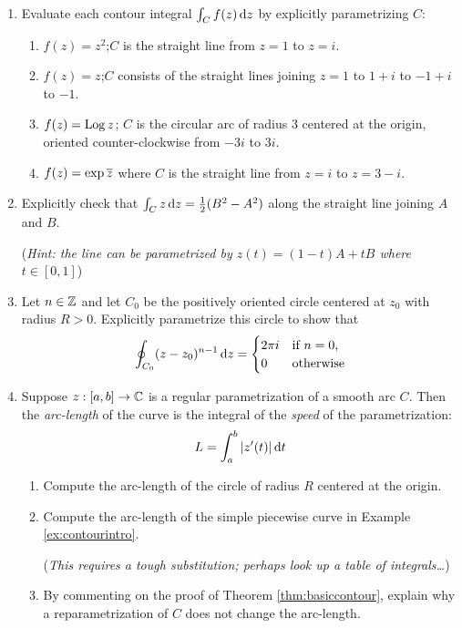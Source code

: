 \begin{exercises}
\begin{enumerate}
	  
	  \item Evaluate each contour integral $\int_Cf(z)\,{\mathrm{d} z}$ by explicitly parametrizing $C$:
		\begin{enumerate}
	    \item $f(z)=z^2$;\quad $C$ is the straight line from $z=1$ to $z=i$.
	    \item $f(z)=z$;\quad $C$ consists of the straight lines joining $z=1$ to $1+i$ to $-1+i$ to $-1$.
	    \item $f(z)=\operatorname{Log} z$; $C$ is the circular arc of radius 3 centered at the origin, oriented counter-clockwise from $-3i$ to $3i$.
	    \item $f(z)=\exp\overline{z}$ where $C$ is the straight line from $z=i$ to $z=3-i$.
		\end{enumerate}
		
		
		\item Explicitly check that $\int_Cz\,{\mathrm{d} z}=\frac 12(B^2-A^2)$ along the straight line joining $A$ and $B$.\par
		(\emph{Hint: the line can be parametrized by $z(t)=(1-t)A+tB$ where $t\in[0,1]$})
		
		
		\item\label{ex:intpowers} Let $n\in \mathbb{Z}$ and let $C_0$ be the positively oriented circle centered at $z_0$ with radius $R>0$. Explicitly parametrize this circle to show that
		\[
			\oint_{C_0}(z-z_0)^{n-1}\,{\mathrm{d} z}=
			\begin{cases}
				2\pi i&\text{if $n=0$,}\\
				0&\text{otherwise}
			\end{cases}
		\]
		
	
	  \item Suppose $z:[a,b]\to\mathbb{C}$ is a regular parametrization of a smooth arc $C$. Then the \emph{arc-length} of the curve is the integral of the \emph{speed} of the parametrization:
	  \[
	  	L=\int_a^{b}\left| z'(t)\right|{\mathrm{d} t}
	  \]
	  \begin{enumerate}
	    \item Compute the arc-length of the circle of radius $R$ centered at the origin.
	    
	    \item Compute the arc-length of the simple piecewise curve in Example \ref{ex:contourintro}.\par
	    (\emph{This requires a tough substitution; perhaps look up a table of integrals\ldots})
	    
	    \item By commenting on the proof of Theorem \ref{thm:basiccontour}, explain why a reparametrization of $C$ does not change the arc-length.
	    

\end{enumerate}
\end{enumerate}
\end{exercises}
